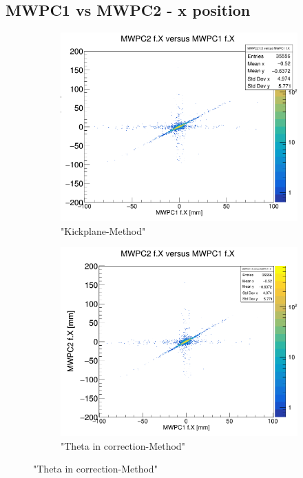 \documentclass[12pt, letterpaper]{article}
\begin{document}
\subsection{MWPC1 vs MWPC2 - x position}
\begin{figure}[!htbp]
\begin{subfigure}{.5\textwidth}
  \centering
  \includegraphics[width=.9\linewidth]{plot_imgs/mw2_mw1_get_centr.png}  
  \caption{"Kickplane-Method"}
  \label{fig:sub-first}
\end{subfigure}
\begin{subfigure}{.5\textwidth}
  \centering
  \includegraphics[width=.9\linewidth]{plot_imgs/mw2_mw1_corr.png} 
  \caption{"Theta \textunderscore in correction-Method"}
  \label{fig:sub-second}

\end{subfigure}
\end{figure}
\end{document}
